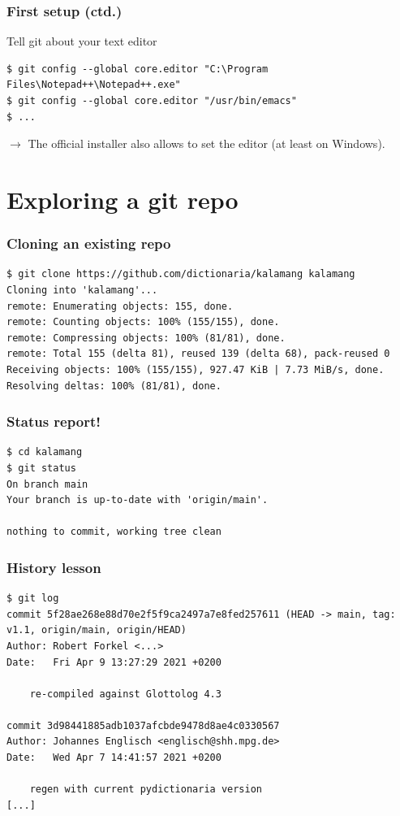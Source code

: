 \documentclass[12pt]{beamer}
\begin{document}
\begin{frame}[fragile]
  \frametitle{First setup (ctd.)}

  \begin{block}{Tell git about your text editor}
    {\footnotesize{}%
      \begin{verbatim}
$ git config --global core.editor "C:\Program Files\Notepad++\Notepad++.exe"
$ git config --global core.editor "/usr/bin/emacs"
$ ...
      \end{verbatim}%
    }
    $\to$ The official installer also allows to set the editor
    (at least on Windows).
  \end{block}
\end{frame}


\section{Exploring a git repo}

\begin{frame}[fragile]
  \frametitle{Cloning an existing repo}

  {\footnotesize{}%
    \begin{verbatim}
$ git clone https://github.com/dictionaria/kalamang kalamang
Cloning into 'kalamang'...
remote: Enumerating objects: 155, done.
remote: Counting objects: 100% (155/155), done.
remote: Compressing objects: 100% (81/81), done.
remote: Total 155 (delta 81), reused 139 (delta 68), pack-reused 0
Receiving objects: 100% (155/155), 927.47 KiB | 7.73 MiB/s, done.
Resolving deltas: 100% (81/81), done.
    \end{verbatim}%
  }
\end{frame}

\begin{frame}[fragile]
  \frametitle{Status report!}

  {\footnotesize{}%
    \begin{verbatim}
$ cd kalamang
$ git status
On branch main
Your branch is up-to-date with 'origin/main'.

nothing to commit, working tree clean
    \end{verbatim}%
  }
\end{frame}

\begin{frame}[fragile]
  \frametitle{History lesson}

  {\footnotesize{}%
    \begin{verbatim}
$ git log
commit 5f28ae268e88d70e2f5f9ca2497a7e8fed257611 (HEAD -> main, tag: v1.1, origin/main, origin/HEAD)
Author: Robert Forkel <...>
Date:   Fri Apr 9 13:27:29 2021 +0200

    re-compiled against Glottolog 4.3

commit 3d98441885adb1037afcbde9478d8ae4c0330567
Author: Johannes Englisch <englisch@shh.mpg.de>
Date:   Wed Apr 7 14:41:57 2021 +0200

    regen with current pydictionaria version
[...]
    \end{verbatim}%
  }
\end{frame}
\end{document}
